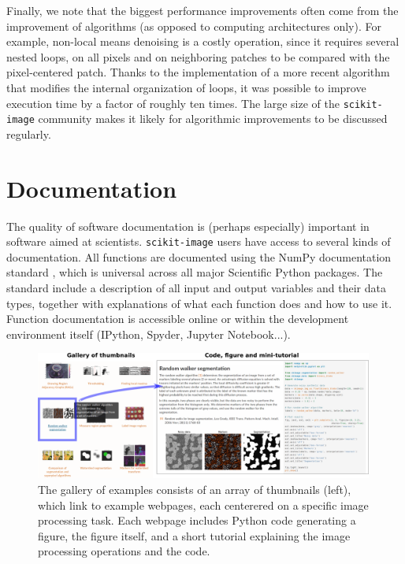 \documentclass[twocolumn]{bmcart}%
\begin{document}
Finally, we note that the biggest performance improvements often come from
the improvement of algorithms (as opposed to computing architectures only). For
example, non-local means denoising \citep{Buades2005} is a costly operation,
since it requires several nested loops, on all pixels and on neighboring
patches to be compared with the pixel-centered patch. Thanks to the
implementation of a more recent algorithm \citep{Darbon2008} that modifies the
internal organization of loops, it was possible to improve execution
time by a factor of roughly ten times.
The large size of the \texttt{scikit-image} community makes it likely for
algorithmic improvements to be discussed regularly.

\section*{Documentation}

The quality of software documentation is (perhaps especially) important
in software aimed at scientists. \texttt{scikit-image} users have access
to several kinds of documentation. All functions are documented using the
NumPy documentation standard \citep{Pawlik2015}, which is universal
across all major Scientific Python packages. The standard include a
description of all input and output variables and their data types,
together with explanations of what each function does and how to use it.
Function documentation is accessible online or within the development
environment itself (IPython, Spyder, Jupyter Notebook...).

\begin{figure}
    \centerline{\includegraphics[width=0.99\textwidth]{figure_gallery}}
\caption{
 The gallery of examples consists of an array of thumbnails (left), which link to example webpages, each centerered on a specific image processing task. Each webpage includes Python code generating a figure, the figure itself, and a short tutorial explaining the image processing operations and the code. \label{fig:gallery}}
\end{figure}
\end{document}
